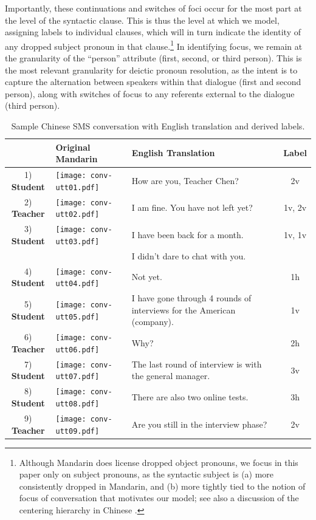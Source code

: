 \documentclass[11pt]{report}
\newcommand{\speaker}[1]{{\bf\footnotesize\textsf{#1}}}
\begin{document}
Importantly, these continuations and switches of foci occur for the most part at the level of the syntactic clause. This is thus the level at which we model, assigning labels to individual clauses, which will in turn indicate the identity of any dropped subject pronoun in that clause.\footnote{Although Mandarin does license dropped object pronouns, we focus in this paper only on subject pronouns, as the syntactic subject is (a) more consistently dropped in Mandarin, and (b) more tightly tied to the notion of focus of conversation that motivates our model; see also a discussion of the centering hierarchy in Chinese \cite{chincent}.} In identifying focus, we remain at the granularity of the ``person'' attribute (first, second, or third person). This is the most relevant granularity for deictic pronoun resolution, as the intent is to capture the alternation between speakers within that dialogue (first and second person), along with switches of focus to any referents external to the dialogue (third person). %


\begin{table}[t]
\begin{center}
\begin{footnotesize}
\begin{tabular}{|c|l|p{7cm}|c|}
\hline
                  & \bf Original Mandarin & \bf English Translation & \bf Label \\ 
\hline
1) \speaker{Student} & \texttt{[image: conv-utt01.pdf]} & How are you, Teacher Chen? & 2v \\
2) \speaker{Teacher} & \texttt{[image: conv-utt02.pdf]} & I am fine. You have not left yet?  & 1v, 2v\\
3) \speaker{Student} & \texttt{[image: conv-utt03.pdf]} & I have been back for a month.  & 1v, 1v \\
                  &                                                & I didn't dare to chat with you. & \\
4) \speaker{Student} & \texttt{[image: conv-utt04.pdf]} & Not yet.  & 1h \\
5) \speaker{Student} & \texttt{[image: conv-utt05.pdf]} & I have gone through 4 rounds of interviews for the American (company). & 1v \\
6) \speaker{Teacher} & \texttt{[image: conv-utt06.pdf]} & Why? & 2h \\
7) \speaker{Student} & \texttt{[image: conv-utt07.pdf]} & The last round of interview is with the general manager. & 3v \\
8) \speaker{Student} & \texttt{[image: conv-utt08.pdf]} & There are also two online tests. & 3h \\
9) \speaker{Teacher} & \texttt{[image: conv-utt09.pdf]} & Are you still in the interview phase? & 2v \\
\hline
\end{tabular}
\end{footnotesize}
\end{center}
\caption{Sample Chinese SMS conversation with English translation and derived labels.}
\label{conv}
\end{table}
\end{document}
